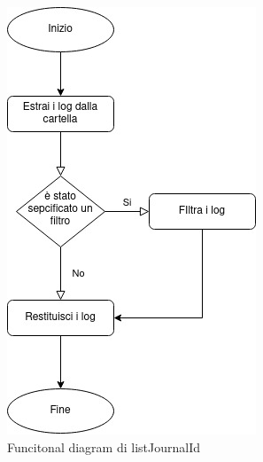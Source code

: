 \documentclass[12pt, a4paper]{article}
\begin{document}
  \begin{figure}
    \includegraphics[width=\linewidth]{listJournalIds.jpg}
    \caption{Funcitonal diagram di listJournalId}
    \label{fig:listJournalIdsDiagram}
  \end{figure}
\end{document}

